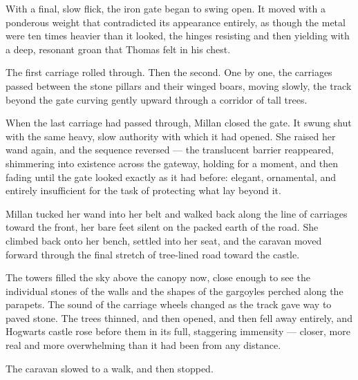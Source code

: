 With a final, slow flick, the iron gate began to swing open. It moved with a ponderous weight that contradicted its appearance entirely, as though the metal were ten times heavier than it looked, the hinges resisting and then yielding with a deep, resonant groan that Thomas felt in his chest.
 
The first carriage rolled through. Then the second. One by one, the carriages passed between the stone pillars and their winged boars, moving slowly, the track beyond the gate curving gently upward through a corridor of tall trees.
 
When the last carriage had passed through, Millan closed the gate. It swung shut with the same heavy, slow authority with which it had opened. She raised her wand again, and the sequence reversed --- the translucent barrier reappeared, shimmering into existence across the gateway, holding for a moment, and then fading until the gate looked exactly as it had before: elegant, ornamental, and entirely insufficient for the task of protecting what lay beyond it.
 
Millan tucked her wand into her belt and walked back along the line of carriages toward the front, her bare feet silent on the packed earth of the road. She climbed back onto her bench, settled into her seat, and the caravan moved forward through the final stretch of tree-lined road toward the castle.
 
The towers filled the sky above the canopy now, close enough to see the individual stones of the walls and the shapes of the gargoyles perched along the parapets. The sound of the carriage wheels changed as the track gave way to paved stone. The trees thinned, and then opened, and then fell away entirely, and Hogwarts castle rose before them in its full, staggering immensity --- closer, more real and more overwhelming than it had been from any distance.
 
The caravan slowed to a walk, and then stopped.
 
